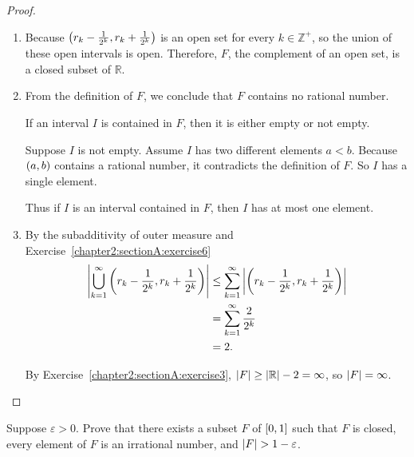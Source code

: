 \begin{proof}
    \begin{enumerate}[label={(\alph*)}]
        \item Because $\left({r_{k} - \frac{1}{2^{k}}, r_{k} + \frac{1}{2^{k}}}\right)$ is an open set for every $k \in \mathbb{Z}^{+}$, so the union of these open intervals is open. Therefore, $F$, the complement of an open set, is a closed subset of $\mathbb{R}$.
        \item From the definition of $F$, we conclude that $F$ contains no rational number.

              If an interval $I$ is contained in $F$, then it is either empty or not empty.

              Suppose $I$ is not empty. Assume $I$ has two different elements $a < b$. Because $\left({a, b}\right)$ contains a rational number, it contradicts the definition of $F$. So $I$ has a single element.

              Thus if $I$ is an interval contained in $F$, then $I$ has at most one element.
        \item By the subadditivity of outer measure and Exercise~\ref{chapter2:sectionA:exercise6}
              \begin{align*}
                  \left\vert{\bigcup^{\infty}_{k=1}\left({r_{k} - \frac{1}{2^{k}}, r_{k} + \frac{1}{2^{k}}}\right)}\right\vert & \leq \sum^{\infty}_{k=1}\left\vert{\left({r_{k} - \frac{1}{2^{k}}, r_{k} + \frac{1}{2^{k}}}\right)}\right\vert \\
                                                                                                              & = \sum^{\infty}_{k=1}\frac{2}{2^{k}}                                                          \\
                                                                                                              & = 2.
              \end{align*}

              By Exercise~\ref{chapter2:sectionA:exercise3}, $\left\vert{F}\right\vert \geq \left\vert{\mathbb{R}}\right\vert - 2 = \infty$, so $\left\vert{F}\right\vert = \infty$.
    \end{enumerate}
\end{proof}
\newpage

\begin{exercise}\label{chapter2:sectionA:exercise13}
    Suppose $\varepsilon > 0$. Prove that there exists a subset $F$ of $\left[{0, 1}\right]$ such that $F$ is closed, every element of $F$ is an irrational number, and $\left\vert{F}\right\vert > 1 - \varepsilon$.
\end{exercise}

